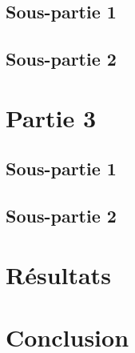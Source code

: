 \documentclass{article}
\begin{document}
\subsection*{Sous-partie 1}
\label{sec:partie2_s1}
\subsection*{Sous-partie 2}
\label{sec:partie2_s2}
\clearpage

\section*{Partie 3}
\label{sec:partie3}
\setcounter{page}{6}
\subsection*{Sous-partie 1}
\label{sec:partie3_s1}
\subsection*{Sous-partie 2}
\label{sec:partie3_s2}
\clearpage

\section*{Résultats}
\label{sec:resultats}
\setcounter{page}{7}
\clearpage

\section*{Conclusion}
\label{sec:conclusion}
\setcounter{page}{8}
\end{document}

